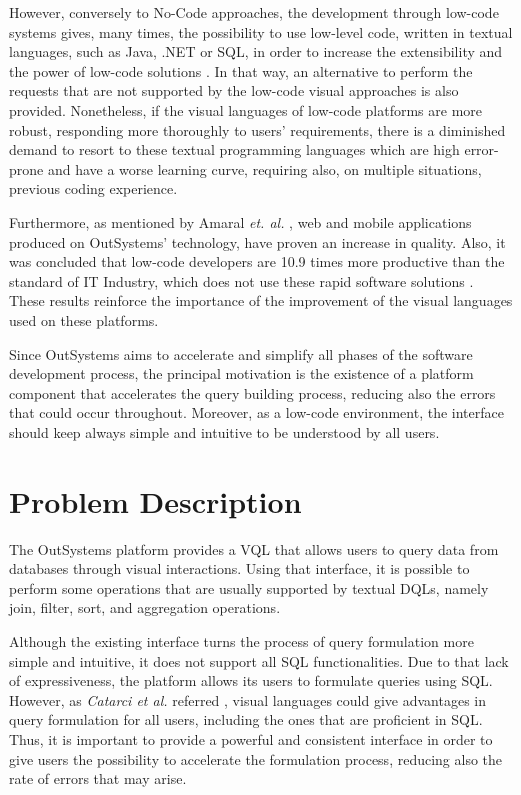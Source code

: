 However, conversely to No-Code approaches, the development through low-code systems gives, many times, the possibility to use low-level code, written in textual languages, such as Java, .NET or \gls{SQL}, in order to increase the extensibility and the power of low-code solutions \cite{outsystems_lowcodeVsNocode}. In that way, an alternative to perform the requests that are not supported by the low-code visual approaches is also provided. Nonetheless, if the visual languages of low-code platforms are more robust, responding more thoroughly to users’ requirements, there is a diminished demand to resort to these textual programming languages which are high error-prone and have a worse learning curve, requiring also, on multiple situations, previous coding experience.

Furthermore, as mentioned by  Amaral \textit{et. al.} \cite{improvingTheDeveloperExperienceWithALowCodeProcessModellingLanguage}, web and mobile applications produced on OutSystems’ technology, have proven an increase in quality. Also, it was concluded that low-code developers are 10.9 times more productive than the standard of \gls{IT} Industry, which does not use these rapid software solutions \cite{outByNumbers2013}. These results reinforce the importance of the improvement of the visual languages used on these platforms.

Since OutSystems aims to accelerate and simplify all phases of the software development process, the principal motivation is the existence of a platform component that accelerates the query building process, reducing also the errors that could occur throughout. Moreover, as a low-code environment,  the interface should keep always simple and intuitive to be understood by all users.


\section{Problem Description}
\label{sec:problem_description}
The OutSystems platform provides a \gls{VQL} that allows users to query data from databases through visual interactions. Using that interface, it is possible to perform some operations that are usually supported by textual \glspl{DQL}, namely join, filter, sort, and aggregation operations.

Although the existing interface turns the process of query formulation more simple and intuitive, it does not support all \gls{SQL} functionalities. Due to that lack of expressiveness, the platform allows its users to formulate queries using SQL. However, as \textit{Catarci et al.} referred \cite{diagrammaticVsTextualQueryLanguages_aComparativeExperiment}, visual languages could give advantages in query formulation for all users, including the ones that are proficient in SQL. Thus, it is important to provide a powerful and consistent interface in order to give users the possibility to accelerate the formulation process, reducing also the rate of errors that may arise. 

